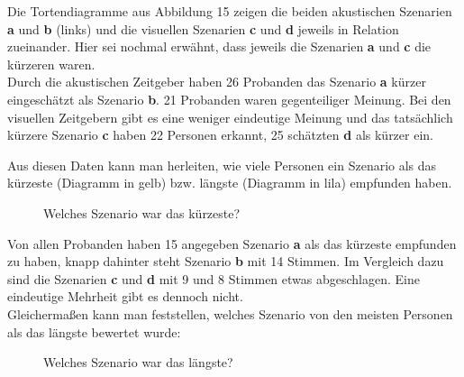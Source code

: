 \documentclass{Paper}
\begin{document}
	Die Tortendiagramme aus Abbildung 15 zeigen die beiden akustischen Szenarien \textbf{a} und \textbf{b} (links) und die visuellen Szenarien \textbf{c} und \textbf{d} jeweils in Relation zueinander. Hier sei nochmal erwähnt, dass jeweils die Szenarien \textbf{a} und \textbf{c} die kürzeren waren.\\
Durch die akustischen Zeitgeber haben 26 Probanden das Szenario \textbf{a} kürzer eingeschätzt als Szenario \textbf{b}. 21 Probanden waren gegenteiliger Meinung. Bei den visuellen Zeitgebern gibt es eine weniger eindeutige Meinung und das tatsächlich kürzere Szenario \textbf{c} haben 22 Personen erkannt, 25 schätzten \textbf{d} als kürzer ein.
	
	
Aus diesen Daten kann man herleiten, wie viele Personen ein Szenario als das kürzeste (Diagramm in gelb) bzw. längste (Diagramm in lila) empfunden haben. 

\begin{figure}[ht]
\caption{Welches Szenario war das kürzeste?}
\label{SzenarienKurz}
\end{figure}
	
Von allen Probanden haben 15 angegeben Szenario \textbf{a} als das kürzeste empfunden zu haben, knapp dahinter steht Szenario \textbf{b} mit 14 Stimmen. Im Vergleich dazu sind die Szenarien \textbf{c} und \textbf{d} mit 9 und 8 Stimmen etwas abgeschlagen. Eine eindeutige Mehrheit gibt es dennoch nicht.\\
Gleichermaßen kann man feststellen, welches Szenario von den meisten Personen als das längste bewertet wurde:

\begin{figure}[ht]
\caption{Welches Szenario war das längste?}
\label{SzenarienLang}
\end{figure}	
\end{document}
